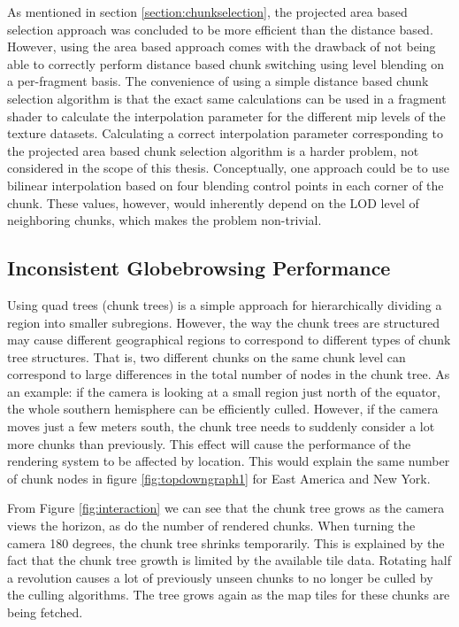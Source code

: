 As mentioned in section \ref{section:chunkselection}, the projected area based selection approach was concluded to be more efficient than the distance based. However, using the area based approach comes with the drawback of not being able to correctly perform distance based chunk switching using level blending on a per-fragment basis. The convenience of using a simple distance based chunk selection algorithm is that the exact same calculations can be used in a fragment shader to calculate the interpolation parameter for the different mip levels of the texture datasets. Calculating a correct interpolation parameter corresponding to the projected area based chunk selection algorithm is a harder problem, not considered in the scope of this thesis. Conceptually, one approach could be to use bilinear interpolation based on four blending control points in each corner of the chunk. These values, however, would inherently depend on the LOD level of neighboring chunks, which makes the problem non-trivial. 

\subsection{Inconsistent Globebrowsing Performance}
Using quad trees (chunk trees) is a simple approach for hierarchically dividing a region into smaller subregions. 
However, the way the chunk trees are structured may cause different geographical regions to correspond to different types of chunk tree structures. 
That is, two different chunks on the same chunk level can correspond to large differences in the total number of nodes in the chunk tree. 
As an example: if the camera is looking at a small region just north of the equator, the whole southern hemisphere can be efficiently culled. 
However, if the camera moves just a few meters south, the chunk tree needs to suddenly consider a lot more chunks than previously. 
This effect will cause the performance of the rendering system to be affected by location. 
This would explain the same number of chunk nodes in figure \ref{fig:topdowngraph1} for East America and New York. 

From Figure \ref{fig:interaction} we can see that the chunk tree grows as the camera views the horizon, as do the number of rendered chunks. When turning the camera 180 degrees, the chunk tree shrinks temporarily. This is explained by the fact that the chunk tree growth is limited by the available tile data. Rotating half a revolution causes a lot of previously unseen chunks to no longer be culled by the culling algorithms. The tree grows again as the map tiles for these chunks are being fetched. 

